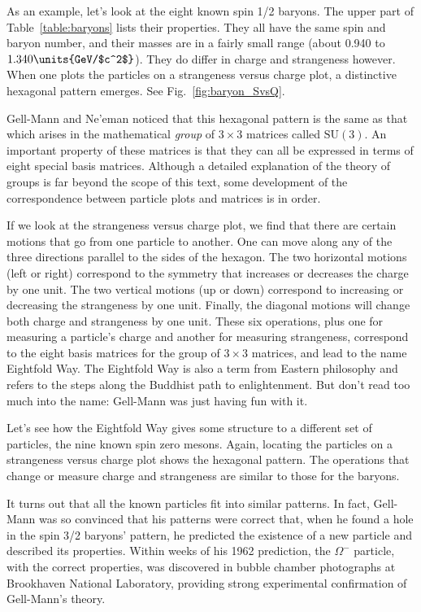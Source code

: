 As an example, let's look at the eight known spin 1/2 baryons.
The upper part of Table~\ref{table:baryons} lists their
properties.  They all have the same spin and baryon number, and
their masses are in a fairly small range (about 0.940 to
$1.340\units{GeV/$c^2$}$).  They do differ in charge and strangeness
however.  When one plots the particles on a strangeness versus
charge plot, a distinctive hexagonal pattern emerges.  See
Fig.~\ref{fig:baryon_SvsQ}.

Gell-Mann and Ne'eman noticed that this hexagonal pattern is the
same as that which arises in the mathematical {\em group} of
$3\times 3$ matrices called $\mathrm{SU}(3)$.  An important property of
these matrices is that they can all be expressed in terms of eight
special basis matrices.  Although a detailed explanation of the
theory of groups is far beyond the scope of this text, some
development of the correspondence between particle plots and
matrices is in order.

If we look at the strangeness versus charge plot, we find that
there are certain motions that go from one particle to another.
One can move along any of the three directions parallel to the
sides of the hexagon.  The two horizontal motions (left or right)
correspond to the symmetry that increases or decreases the charge
by one unit.  The two vertical motions (up or down) correspond to
increasing or decreasing the strangeness by one unit.  Finally,
the diagonal motions will change both charge and strangeness by
one unit.  These six operations, plus one for measuring a
particle's charge and another for measuring strangeness,
correspond to the eight basis matrices for the group of $3\times
3$ matrices, and lead to the name Eightfold Way. The Eightfold Way
is also a term from Eastern philosophy and refers to the steps
along the Buddhist path to enlightenment.  But don't read too much
into the name: Gell-Mann was just having fun with it.


Let's see how the Eightfold Way gives some structure to a
different set of particles, the nine known spin zero mesons.
Again, locating the particles on a strangeness versus charge
plot shows the hexagonal pattern.  The operations that change or
measure charge and strangeness are similar to those for the
baryons.

It turns out that all the known particles fit into similar
patterns. In fact, Gell-Mann was so convinced that his patterns
were correct that, when he found a hole in the spin 3/2 baryons'
pattern, he predicted the existence of a new particle and
described its properties.  Within weeks of his 1962 prediction,
the $\Omega^-$ particle, with the correct properties, was
discovered in bubble chamber photographs at Brookhaven National
Laboratory, providing strong experimental confirmation of
Gell-Mann's theory.

